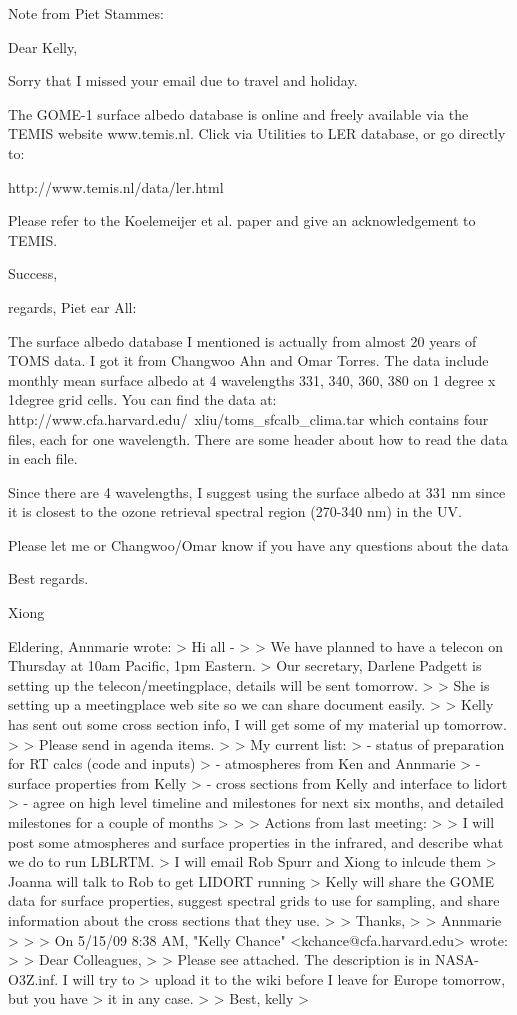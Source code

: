 Note from Piet Stammes:

Dear Kelly,

Sorry that I missed your email due to travel and holiday.

The GOME-1 surface albedo database is online and freely available via the TEMIS website www.temis.nl.
Click via Utilities to LER database, or go directly to:

http://www.temis.nl/data/ler.html

Please refer to the Koelemeijer et al. paper and give an acknowledgement to TEMIS.

Success,

regards,
Piet
ear All:

The surface albedo database I mentioned is actually from almost 20 years of TOMS data. I got it from Changwoo Ahn and Omar Torres. The data include monthly mean surface albedo at 4 wavelengths 331, 340, 360, 380 on 1 degree x 1degree grid cells. You can find the data at:
http://www.cfa.harvard.edu/~xliu/toms_sfcalb_clima.tar
which contains four files, each for one wavelength. There are some header about how to read the data in each file.

Since there are 4 wavelengths, I suggest using the surface albedo at 331 nm since it is closest to the ozone retrieval spectral region (270-340 nm) in the UV.

Please let me or Changwoo/Omar know if you have any questions about the data

Best regards.

Xiong


Eldering, Annmarie wrote:
> Hi all -
>
> We have planned to have a telecon on Thursday at 10am Pacific, 1pm Eastern.
> Our secretary, Darlene Padgett is setting up the telecon/meetingplace, details will be sent tomorrow.
>
> She is setting up a meetingplace web site so we can share document easily.
>
> Kelly has sent out some cross section info, I will get some of my material up tomorrow.
>
> Please send in agenda items.
>
> My current list:
>  - status of preparation for RT calcs (code and inputs)
>  - atmospheres from Ken and Annmarie
>  - surface properties from Kelly
>  - cross sections from Kelly and interface to lidort
>  - agree on high level timeline and milestones for next six months, and detailed milestones for a couple of months
>
>
> Actions from last meeting:
>
> I will post some atmospheres and surface properties in the infrared, and describe what we do to run LBLRTM.
> I will email Rob Spurr and Xiong to inlcude them
> Joanna will talk to Rob to get LIDORT running
> Kelly will share the GOME data for surface properties, suggest spectral grids to use for sampling, and share information about the cross sections that they use.
>
> Thanks,
>
> Annmarie
>
>
> On 5/15/09 8:38 AM, "Kelly Chance" <kchance@cfa.harvard.edu> wrote:
>
>     Dear Colleagues,
>
>     Please see attached. The description is in NASA-O3Z.inf. I will try to
>     upload it to the wiki before I leave for Europe tomorrow, but you have
>     it in any case.
>
>     Best, kelly
>
